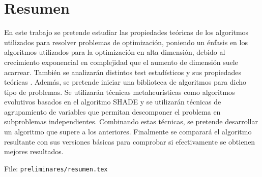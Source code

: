 %

\chapter{Resumen}

En este trabajo se pretende estudiar las propiedades teóricas de los algoritmos utilizados para resolver problemas de optimización, poniendo un énfasis en los algoritmos utilizados para la optimización en alta dimensión, debido al crecimiento exponencial en complejidad que el aumento de dimensión suele acarrear. También se analizarán distintos test estadísticos y sus propiedades teóricas . Además, se pretende iniciar una biblioteca de algoritmos para dicho tipo de problemas. Se utilizarán técnicas metaheurísticas como algoritmos evolutivos basados en el algoritmo SHADE y se utilizarán técnicas de agrupamiento de variables que permitan descomponer el problema en subproblemas independientes. Combinando estas técnicas, se pretende desarrollar un algoritmo que supere a los anteriores. Finalmente se comparará el algoritmo resultante con sus versiones básicas para comprobar si efectivamente se obtienen mejores resultados.

File: \texttt{preliminares/resumen.tex}

\endinput

